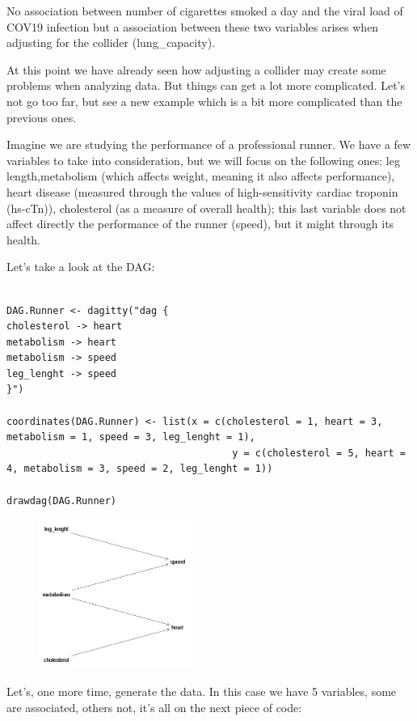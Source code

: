 \documentclass{article}
\begin{document}
No association between number of cigarettes smoked a day and the viral load of COV19 infection but a association between these two variables arises when  adjusting for the collider (lung\_capacity).

At this point we have already seen how adjusting a collider may create some problems when analyzing data. But things can get a lot more complicated. Let's  not go too far, but see a new example which is a bit more complicated than the previous ones.

Imagine we are studying the performance of a professional runner. We have a few variables to take into consideration, but we will focus on the following ones: leg length,metabolism (which affects weight, meaning it also affects performance), heart disease (measured through the values of high-sensitivity cardiac troponin  (hs-cTn)), cholesterol (as a measure of overall health); this last variable  does not affect directly the performance of the runner (speed), but it might through its health. 

Let's take a look at the DAG:

\begin{lstlisting}

DAG.Runner <- dagitty("dag {
cholesterol -> heart
metabolism -> heart
metabolism -> speed
leg_lenght -> speed
}")

coordinates(DAG.Runner) <- list(x = c(cholesterol = 1, heart = 3, metabolism = 1, speed = 3, leg_lenght = 1),
                                       y = c(cholesterol = 5, heart = 4, metabolism = 3, speed = 2, leg_lenght = 1))
                                       
drawdag(DAG.Runner)

\end{lstlisting}


\begin{figure}[h]
\includegraphics[width=5cm]{DAG_Runner.png}
\centering
\end{figure}

Let's, one more time, generate the data. In this case we have 5 variables, some are associated, others not, it's all on the next piece of code:
\end{document}
